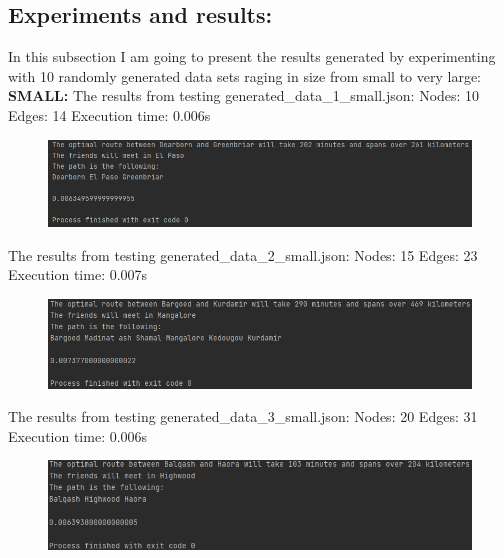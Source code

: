 \documentclass[12pt]{article}
\begin{document}
\subsection{Experiments and results:}
In this subsection I am going to present the results generated by experimenting with 10 randomly generated data sets raging in size from small to very large:
\newline
\newline
\textbf{SMALL:}
\newline
The results from testing generated\_data\_1\_small.json:
\newline
Nodes: 10
\newline
Edges: 14
\newline
Execution time: 0.006s
\begin{figure}[htp]
    \centering
    \includegraphics[width=1\textwidth]{small1.png}
\end{figure}
\newline
The results from testing generated\_data\_2\_small.json:
\newline
Nodes: 15
\newline
Edges: 23
\newline
Execution time: 0.007s
\begin{figure}[htp]
    \centering
    \includegraphics[width=1\textwidth]{small2.png}
\end{figure}
\newpage
The results from testing generated\_data\_3\_small.json:
\newline
Nodes: 20
\newline
Edges: 31
\newline
Execution time: 0.006s
\begin{figure}[htp]
    \centering
    \includegraphics[width=1\textwidth]{small3.png}
\end{figure}
\end{document}
